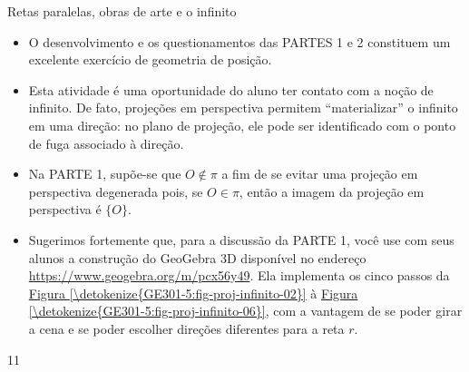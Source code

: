 \begin{sugestions}{Retas paralelas, obras de arte e o infinito}
{
\begin{itemize}
\item {} 
O desenvolvimento e os questionamentos das PARTES 1 e 2 constituem um excelente exercício de geometria de posição.

\item {} 
Esta atividade é uma oportunidade do aluno ter contato com a noção de infinito. De fato, projeções em perspectiva permitem “materializar” o infinito em uma direção: no plano de projeção, ele pode ser identificado com o ponto de fuga associado à direção.

\item {} 
Na PARTE 1, supõe-se que \(O \not\in \pi\) a fim de se evitar uma projeção em perspectiva degenerada pois, se \(O \in \pi\), então a imagem da projeção em perspectiva é \(\{O\}\).

\item {} 
Sugerimos fortemente que, para a discussão da PARTE 1, você use com seus alunos a construção do GeoGebra 3D disponível no endereço \url{https://www.geogebra.org/m/pcx56y49}. Ela implementa os cinco passos da \hyperref[\detokenize{GE301-5:fig-proj-infinito-02}]{Figura \ref{\detokenize{GE301-5:fig-proj-infinito-02}}} à \hyperref[\detokenize{GE301-5:fig-proj-infinito-06}]{Figura \ref{\detokenize{GE301-5:fig-proj-infinito-06}}}, com a vantagem de se poder girar a cena e se poder escolher direções diferentes para a reta \(r\).


\end{itemize}
}{1}{1}
\end{sugestions}

